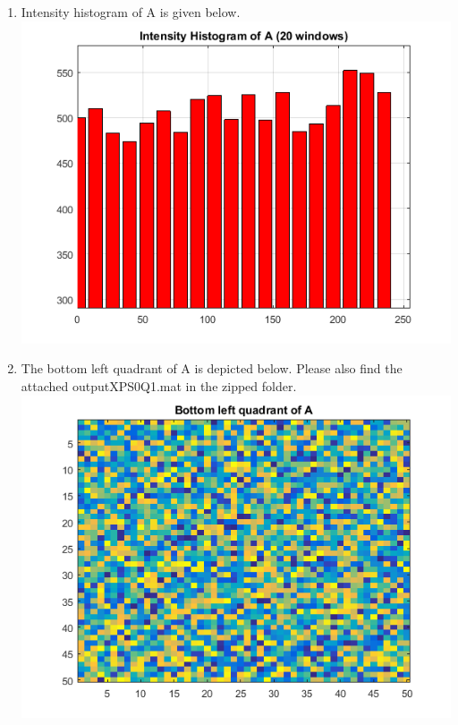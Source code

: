 \documentclass[man]{apa6}
\begin{document}
\begin{enumerate}
\begin{enumerate}
				\item Intensity histogram of A is given below.
					\includegraphics[width=\linewidth]{plots/1-A-4/b.png}
				
				\item The bottom left quadrant of A is depicted below. Please also find the attached outputXPS0Q1.mat in the zipped folder.
					\includegraphics[width=\linewidth]{plots/1-A-4/c.png}
					

\end{enumerate}
\end{enumerate}
\end{document}
